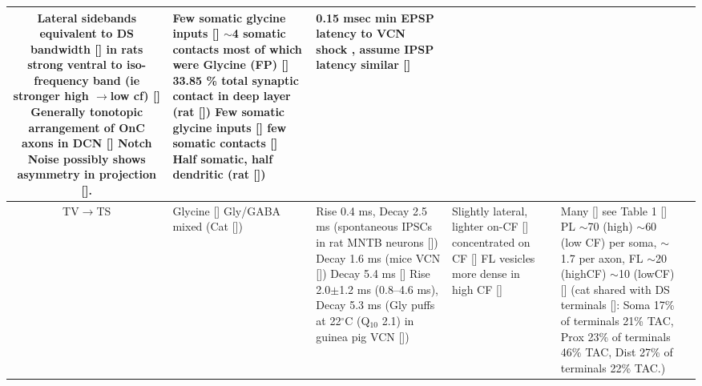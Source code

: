 \begin{longtable}{cYYYYYY}
Lateral sidebands equivalent to DS bandwidth
[] 
in rats strong ventral to iso-frequency band (ie stronger high \ensuremath{\rightarrow}low cf)
[] 
Generally tonotopic arrangement of OnC axons in DCN []
Notch Noise possibly shows asymmetry in projection [].      
                                & 
Few somatic glycine inputs 
[]
$\sim$4 somatic contacts most of which were Glycine (FP) []
33.85 \% total synaptic contact in deep layer (rat [])
Few somatic glycine inputs [] 
few  somatic contacts []                   
Half somatic, half dendritic (rat [])
                                & 
0.15 msec min EPSP latency to VCN shock , assume IPSP latency similar
[]\\ \midrule
TV\ensuremath{\rightarrow}TS                        
                                & %
Glycine []
Gly\slash GABA mixed (Cat [])                  
                                & %
Rise 0.4 ms, Decay 2.5 ms (spontaneous IPSCs in rat MNTB neurons [])
Decay 1.6 ms (mice VCN [])
Decay 5.4 ms []    
Rise 2.0$\pm$1.2 ms (0.8--4.6 ms), Decay 5.3 ms (Gly puffs at 22$^\circ$C (Q$_{10}$ 2.1) in  guinea pig VCN [])
                                & %
Slightly lateral, lighter on-CF [] 
concentrated on CF [] 
FL vesicles more dense in high CF []                        
                                & %
                                & %
Many [] see
Table 1 [] 
PL $\sim$70 (high) $\sim$60 (low CF) per soma,
$\sim$1.7 per axon, 
FL $\sim$20 (highCF) $\sim$10 (lowCF)  []                        
(cat shared with DS terminals []: 
Soma 17\% of terminals 21\% TAC,
Prox 23\% of terminals 46\% TAC,
Dist 27\% of terminals 22\% TAC.)



\end{longtable}
